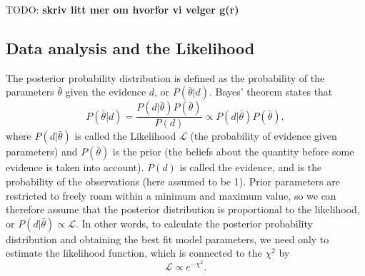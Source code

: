 \documentclass[aps,pre,twocolumn,letterpaper,floatfix,showpacs]{revtex4}
\newcommand{\todo}[1]{ {\color{Magenta} TODO: \color{Blue} \textbf{#1} }}
\begin{document}
\todo{skriv litt mer om hvorfor vi velger g(r)}








\subsection{Data analysis and the Likelihood}

The posterior probability distribution is defined as the probability of the parameters
$\bar \theta$ given the evidence $d$, or $P(\bar \theta | d)$. Bayes' theorem states that 
\begin{equation}
P(\bar \theta | d) = \frac{P(d | \bar \theta)P(\bar \theta)}{P(d)} \propto P(d | \bar \theta)P(\bar \theta),
\end{equation}
where $P(d | \bar \theta)$ is called the Likelihood $\mathcal L$ (the probability of
evidence given parameters) and $P(\bar \theta)$ is the prior (the beliefs about the
quantity before some evidence is taken into account). $P(d)$ is called the evidence,
and is the probability of the observations (here assumed to be 1). Prior parameters
are restricted to freely roam within a minimum and maximum value, so we can therefore
assume that the posterior distribution is proportional to the likelihood, or
$P(d | \bar \theta) \propto \mathcal L$. In other words, to calculate the posterior
probability distribution and obtaining the best fit model parameters, we need only
to estimate the likelihood function, which is connected to the $\chi^2$ by 
\begin{equation}
\mathcal L \propto e^{-\chi^2}.
\end{equation}
\end{document}
